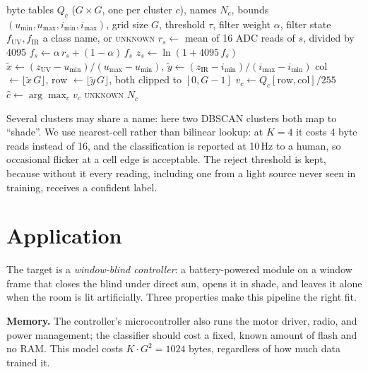 \documentclass[10pt,a4paper,twocolumn]{article}
\begin{document}
\begin{algorithm}[!bt]
\caption{Online classification on the ESP32-S3 (one sample).}
\label{alg:online}
\begin{algorithmic}[1]
\Require byte tables $Q_c$ ($G\times G$, one per cluster $c$), names $N_c$,
bounds $(u_{\min},u_{\max},i_{\min},i_{\max})$, grid size $G$, threshold $\tau$,
filter weight $\alpha$, filter state $f_{\mathrm{UV}}, f_{\mathrm{IR}}$
\Ensure a class name, or \textsc{unknown}
  \State $r_s \gets$ mean of 16 ADC reads of $s$, divided by 4095
  \State $f_s \gets \alpha\, r_s + (1-\alpha)\, f_s$ 
  \State $z_s \gets \ln(1 + 4095\, f_s)$ 
\EndFor
\State $\tilde{x} \gets (z_{\mathrm{UV}}-u_{\min})/(u_{\max}-u_{\min})$,\;
       $\tilde{y} \gets (z_{\mathrm{IR}}-i_{\min})/(i_{\max}-i_{\min})$
\State col $\gets \lfloor \tilde{x}\,G \rfloor$, row $\gets \lfloor \tilde{y}\,G \rfloor$, both clipped to $[0,G-1]$
  \State $v_c \gets Q_c[\text{row},\text{col}]/255$ 
\EndFor
\State $\hat{c} \gets \arg\max_c v_c$
  \State \Return \textsc{unknown} 
\EndIf
\State \Return $N_{\hat{c}}$
\end{algorithmic}
\end{algorithm}

Several clusters may share a name: here two DBSCAN clusters both map to ``shade''. We use
nearest-cell rather than bilinear lookup: at $K=4$ it costs 4 byte reads instead of 16,
and the classification is reported at 10\,Hz to a human, so occasional flicker at a cell
edge is acceptable. The reject threshold is kept, because without it every reading,
including one from a light source never seen in training, receives a confident label.

\section{Application}

The target is a \emph{window-blind controller}: a battery-powered module on a window frame
that closes the blind under direct sun, opens it in shade, and leaves it alone when the
room is lit artificially. Three properties make this pipeline the right fit.

\textbf{Memory.} The controller's microcontroller also runs the motor driver, radio, and
power management; the classifier should cost a fixed, known amount of flash and no RAM.
This model costs $K\cdot G^2 = 1024$ bytes, regardless of how much data trained it.
\end{document}
